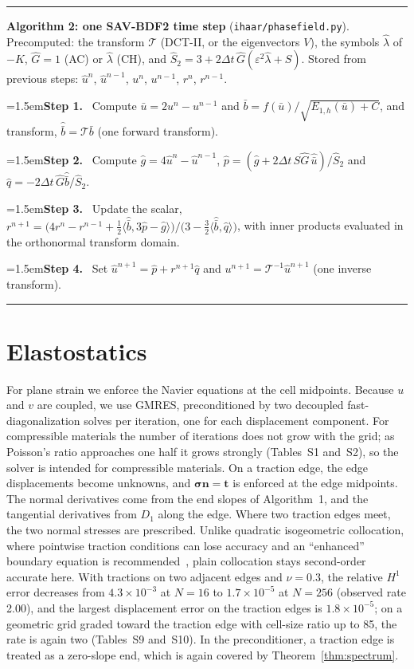 \documentclass[smallextended,envcountsame]{svjour3}
\newcommand{\step}[1]{\par\noindent\hangindent=1.5em\hangafter=1\textbf{Step #1.}\ }
\begin{document}
\begin{algorithm}[t]\small\hrule\smallskip
\noindent\textbf{Algorithm 2: one SAV-BDF2 time step} (\texttt{ihaar/phasefield.py}).
Precomputed: the transform $\mathcal T$ (DCT-II, or the eigenvectors $V$), the symbols $\hat\lambda$ of
$-K$, $\hat G=1$ (AC) or $\hat\lambda$ (CH), and $\hat S_2=3+2\Delta t\,\hat G(\varepsilon^2\hat\lambda+S)$.
Stored from previous steps: $\hat u^n$, $\hat u^{n-1}$, $u^n$, $u^{n-1}$, $r^n$, $r^{n-1}$.
\step{1} Compute $\bar u=2u^n-u^{n-1}$ and $\bar b=f(\bar u)/\sqrt{E_{1,h}(\bar u)+C}$, and transform, $\hat{\bar b}=\mathcal T\bar b$ (one forward transform).
\step{2} Compute $\hat g=4\hat u^n-\hat u^{n-1}$, $\hat p=(\hat g+2\Delta t\,S\hat G\,\hat{\bar u})/\hat S_2$ and $\hat q=-2\Delta t\,\hat G\hat{\bar b}/\hat S_2$.
\step{3} Update the scalar, $r^{n+1}=\big(4r^n-r^{n-1}+\tfrac12\langle\hat{\bar b},3\hat p-\hat g\rangle\big)/\big(3-\tfrac32\langle\hat{\bar b},\hat q\rangle\big)$, with inner products evaluated in the orthonormal transform domain.
\step{4} Set $\hat u^{n+1}=\hat p+r^{n+1}\hat q$ and $u^{n+1}=\mathcal T^{-1}\hat u^{n+1}$ (one inverse transform).
\smallskip\hrule
\end{algorithm}

\section{Elastostatics}\label{sec:elast}
For plane strain we enforce the Navier equations at the cell midpoints. Because $u$ and $v$ are coupled,
we use GMRES, preconditioned by two decoupled fast-diagonalization solves per iteration, one for each
displacement component. For compressible materials the number of iterations does not grow with the grid;
as Poisson's ratio approaches one half it grows strongly (Tables~S1 and~S2), so the solver is intended for
compressible materials. On a traction edge, the edge displacements become unknowns, and
$\boldsymbol\sigma\mathbf n=\mathbf t$ is enforced at the edge midpoints. The normal derivatives come from
the end slopes of Algorithm~1, and the tangential derivatives from $D_1$ along the edge. Where two traction
edges meet, the two normal stresses are prescribed. Unlike quadratic isogeometric collocation, where
pointwise traction conditions can lose accuracy and an ``enhanced'' boundary equation is
recommended~\cite{delorenzis2015isogeometric}, plain collocation stays second-order accurate here. With tractions on two adjacent edges and $\nu=0.3$,
the relative $H^1$ error decreases from $4.3\times10^{-3}$ at $N=16$ to $1.7\times10^{-5}$ at
$N=256$ (observed rate 2.00), and the largest displacement error on the traction edges is
$1.8\times10^{-5}$; on a geometric grid graded toward the traction edge with cell-size ratio up to
85, the rate is again two (Tables~S9 and~S10). In the preconditioner, a traction edge is treated as a zero-slope end,
which is again covered by Theorem~\ref{thm:spectrum}.
\end{document}
